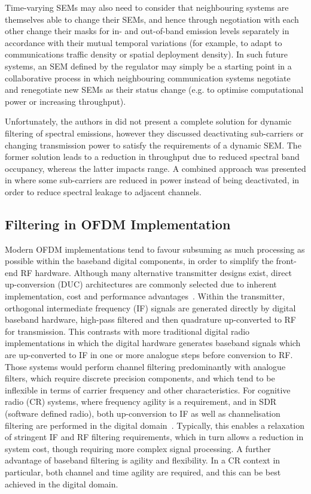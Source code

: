 Time-varying SEMs may also need to consider that neighbouring systems are themselves able to change their SEMs, and hence through negotiation with each other change their masks for in- and out-of-band emission levels separately in accordance with their mutual temporal variations (for example, to adapt to communications traffic density or spatial deployment density).
In such future systems, an SEM defined by the regulator may simply be a starting point in a collaborative process in which neighbouring communication systems negotiate and renegotiate new SEMs as their status change (e.g. to optimise computational power or increasing throughput).

Unfortunately, the authors in \cite{Forde2010} did not present a complete solution for dynamic filtering of spectral emissions, however they discussed deactivating sub-carriers or changing transmission power to satisfy the requirements of a dynamic SEM.
The former solution leads to a reduction in throughput due to reduced spectral band occupancy, whereas the latter impacts range.
A combined approach was presented in \cite{Kryszkiewicz2013} where some sub-carriers are reduced in power instead of being deactivated, in order to reduce spectral leakage to adjacent channels.

\subsection{Filtering in OFDM Implementation}
\label{sec:how_ofdm_works}

Modern OFDM implementations tend to favour subsuming as much processing as possible within the baseband digital components, in order to simplify the front-end RF hardware.
Although many alternative transmitter designs exist, direct up-conversion (DUC) architectures are commonly selected due to inherent implementation, cost and performance advantages~\cite{masse2006direct}.
Within the transmitter, orthogonal intermediate frequency (IF) signals are generated directly by digital baseband hardware, high-pass filtered and then quadrature up-converted to RF for transmission.
This contrasts with more traditional digital radio implementations in which the digital hardware generates baseband signals which are up-converted to IF in one or more analogue steps before conversion to RF.
Those systems would perform channel filtering predominantly with analogue filters, which require discrete precision components, and which tend to be inflexible in terms of carrier frequency and other characteristics.
For cognitive radio (CR) systems, where frequency agility is a requirement, and in SDR (software defined radio), both up-conversion to IF as well as channelisation filtering are performed in the digital domain~\cite{Chen2005,Dowle2006}.
Typically, this enables a relaxation of stringent IF and RF filtering requirements, which in turn allows a reduction in system cost, though requiring more complex signal processing.
A further advantage of baseband filtering is agility and flexibility.
In a CR context in particular, both channel and time agility are required, and this can be best achieved in the digital domain.

